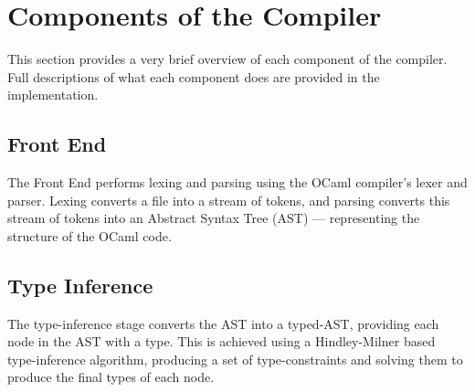 
\section{Components of the Compiler}
This section provides a very brief overview of each component of the compiler. Full descriptions of what each component does are provided in the implementation.

\subsection{Front End}
The Front End performs lexing and parsing using the OCaml compiler's lexer and parser. Lexing converts a file into a stream of tokens, and parsing converts this stream of tokens into an Abstract Syntax Tree (AST) --- representing the structure of the OCaml code.

\subsection{Type Inference}
The type-inference stage converts the AST into a typed-AST, providing each node in the AST with a type. This is achieved using a Hindley-Milner based type-inference algorithm, producing a set of type-constraints and solving them to produce the final types of each node.

